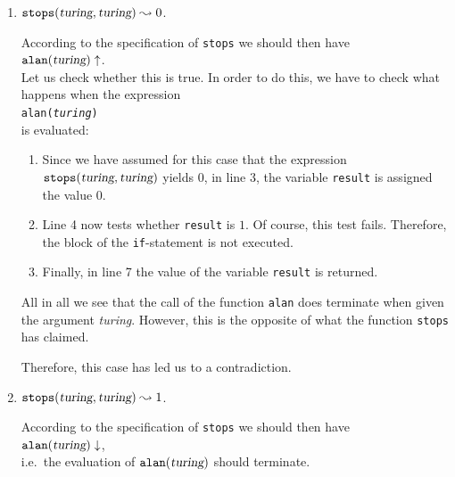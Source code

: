 \begin{enumerate}
\item $\mathtt{stops}(\textsl{turing}, \textsl{turing}) \leadsto 0$. 

      According to the specification of \texttt{stops} we should then have
      \\[0.2cm]
      \hspace*{1.3cm}
      $\mathtt{alan}(\textsl{turing}) \uparrow$.
      \\[0.2cm]
      Let us check whether this is true.  In order to do this, we have to check what happens when
      the expression
      \\[0.2cm]
      \hspace*{1.3cm}
      \texttt{alan(\textsl{turing})} 
      \\[0.2cm]
      is evaluated:
      \begin{enumerate}
      \item Since we have assumed for this case that the expression 
            $\mathtt{stops}(\textsl{turing}, \textsl{turing})$ yields $0$, 
            in line 3, the variable \texttt{result} is assigned the value 0. 
      \item Line 4 now tests whether \texttt{result} is $1$.  Of course,
            this test fails.  Therefore, the block of the \texttt{if}-statement is not executed.
      \item Finally, in line 7 the value of the variable \texttt{result} is returned. 
      \end{enumerate}
      All in all we see that the call of the function \texttt{alan} does terminate when given the argument
      \textsl{turing}.  However, this is the opposite of what the function \texttt{stops} has claimed.
      
      Therefore, this case has led us to a contradiction.
\item  $\mathtt{stops}(\textsl{turing}, \textsl{turing}) \leadsto 1$. 

      According to the specification of \texttt{stops} we should then have
      \\[0.2cm]
      \hspace*{1.3cm}
      $\mathtt{alan}(\textsl{turing}) \downarrow$, 
      \\[0.2cm]
      i.e.~the evaluation of $\mathtt{alan}(\textsl{turing})$ should terminate.
      

\end{enumerate}
